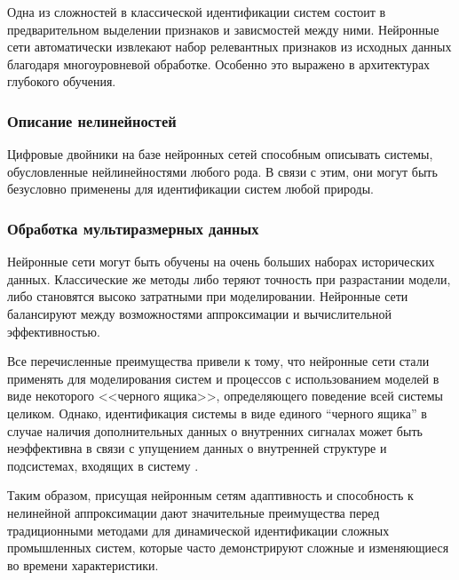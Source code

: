 Одна из сложностей в классической идентификации систем состоит в предварительном
выделении признаков и зависмостей между ними. Нейронные сети автоматически
извлекают набор релевантных признаков из исходных данных благодаря
многоуровневой обработке. Особенно это выражено в архитектурах глубокого
обучения.

\subsubsection{Описание нелинейностей}

Цифровые двойники на базе нейронных сетей способным описывать системы,
обусловленные нейлинейностями любого рода. В связи с этим, они могут быть
безусловно применены для идентификации систем любой природы.

\subsubsection{Обработка мультиразмерных данных}

Нейронные сети могут быть обучены на очень больших наборах исторических данных.
Классические же методы либо теряют точность при разрастании модели, либо
становятся высоко затратными при моделировании. Нейронные сети балансируют между
возможностями аппроксимации и вычислительной эффективностью.


Все перечисленные преимущества привели к тому, что нейронные сети стали
применять для моделирования систем и процессов с использованием моделей в виде
некоторого <<черного ящика>>, определяющего поведение всей системы целиком.
Однако, идентификация системы в виде единого “черного ящика” в случае наличия
дополнительных данных о внутренних сигналах может быть неэффективна в связи с
упущением данных о внутренней структуре и подсистемах, входящих в систему
\cite{bib:ident}. 

Таким образом, присущая нейронным сетям адаптивность и способность к нелинейной
аппроксимации дают значительные преимущества перед традиционными методами для
динамической идентификации сложных промышленных систем, которые часто
демонстрируют сложные и изменяющиеся во времени характеристики.


